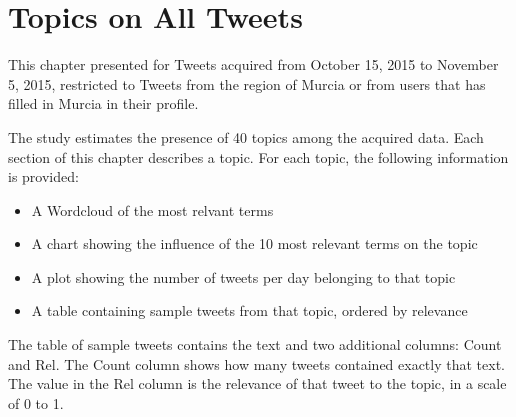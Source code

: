 \chapter{Topics on All Tweets}

This chapter presented for Tweets acquired from October 15, 2015 to November 5, 2015, restricted to Tweets from the region of Murcia or from users that has filled in Murcia in their profile.

The study estimates the presence of 40 topics among the acquired data. Each section of this chapter describes a topic. For each topic, the following information is provided:

\begin{itemize}
\item A Wordcloud of the most relvant terms
\item A chart showing the influence of the 10 most relevant terms on the topic
\item A plot showing the number of tweets per day belonging to that topic
\item A table containing sample tweets from that topic, ordered by relevance
\end{itemize}

The table of sample tweets contains the text and two additional columns: Count and Rel. The Count column shows how many tweets contained exactly that text. The value in the Rel column is the relevance of that tweet to the topic, in a scale of 0 to 1.
